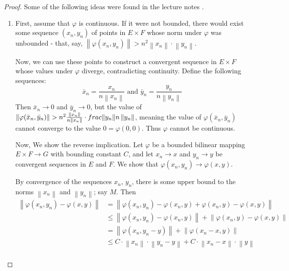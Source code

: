 \documentclass[12pt]{article}
\theoremstyle{definition}
\begin{document}
\begin{proof}
	Some of the following ideas were found in the lecture notes \cite{unimi}.
	\begin{enumerate}[label=(\roman*)]
		\item First, assume that $\varphi$ is continuous. If it were not bounded, there would exist some sequence $(x_n, y_n)$ of points in $E \times F$ whose norm under $\varphi$ was unbounded - that, say, $\left \lVert { \varphi(x_n,y_n) } \right \lVert > n^2 \left \lVert { x_n } \right \lVert \cdot \left \lVert { y_n } \right \lVert $.
			\par Now, we can use these points to construct a convergent sequence in $E\times F$ whose values under $\varphi$ diverge, contradicting continuity. Define the following sequences:
			\[\bar x_n = \frac{x_n}{n\left \lVert { x_n } \right \lVert } \text{  and  }\bar y_n = \frac{y_n}{n\left \lVert { y_n } \right \lVert }\]
			Then $\bar x_n \to 0$ and $\bar y_n \to 0$, but the value of $\left \lVert { \varphi(\bar x_n, \bar y_n) } \right \lVert > n^2 \frac{\left \lVert { x_n } \right \lVert}{n\left \lVert { x_n } \right \lVert }\cdot \\frac{\left \lVert { y_n } \right \lVert }{n\left \lVert { y_n } \right \lVert }$, meaning the value of $\varphi(\bar x_n, \bar y_n)$ cannot converge to the value $0 = \varphi(0,0)$. Thus $\varphi$ cannot be continuous.
			\par Now, We show the reverse implication. Let $\varphi$ be a bounded bilinear mapping $E\times F \to G$ with bounding constant $C$, and let $x_n \to x$ and $y_n \to y$ be convergent sequences in $E$ and $F$. We show that $\varphi(x_n, y_n) \to \varphi(x,y)$. 
			\par By convergence of the sequences $x_n$, $y_n$, there is some upper bound to the norms $\left \lVert { x_n } \right \lVert $ and $\left \lVert {  y_n } \right \lVert $; say $M$. Then
			\begin{align*}
				\left \lVert { \varphi(x_n, y_n) - \varphi(x,y) } \right \lVert &= \left \lVert { \varphi(x_n, y_n) - \varphi(x_n, y) + \varphi(x_n, y) - \varphi(x,y) } \right \lVert \\
				&\leq \left \lVert { \varphi(x_n, y_n) - \varphi(x_n, y) } \right \lVert +\left \lVert { \varphi(x_n, y) - \varphi(x,y) } \right \lVert \\
				&= \left \lVert { \varphi(x_n, y_n - y) } \right \lVert  + \left \lVert { \varphi(x_n - x, y) } \right \lVert \\
				&\leq C \cdot \left \lVert { x_n } \right \lVert \cdot \left \lVert { y_n - y } \right \lVert + C \cdot\left \lVert { x_n - x } \right \lVert \cdot \left \lVert { y } \right \lVert \\

\end{align*}
\end{enumerate}
\end{proof}
\end{document}
